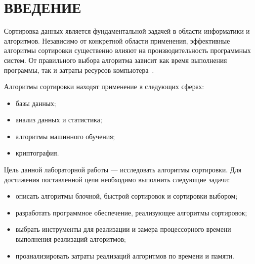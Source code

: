 \chapter*{ВВЕДЕНИЕ}

Сортировка данных является фундаментальной задачей в области информатики и алгоритмов. 
Независимо от конкретной области применения, эффективные алгоритмы сортировки существенно влияют на производительность программных систем. 
От правильного выбора алгоритма зависит как время выполнения программы, так и затраты ресурсов компьютера~\cite{knut}.

Алгоритмы сортировки находят применение в следующих сферах:
\begin{itemize}
	\item базы данных;
	\item анализ данных и статистика;
	\item алгоритмы машинного обучения;
	\item криптография.
\end{itemize}

Цель данной лабораторной работы --- исследовать алгоритмы сортировки.
Для достижения поставленной цели необходимо выполнить следующие задачи:
\begin{itemize}
	\item описать алгоритмы блочной, быстрой сортировок и сортировки выбором;
	\item разработать программное обеспечение, реализующее алгоритмы сортировок;
	\item выбрать инструменты для реализации и замера процессорного времени
	выполнения реализаций алгоритмов;
	\item проанализировать затраты реализаций алгоритмов по времени и памяти.
\end{itemize}
